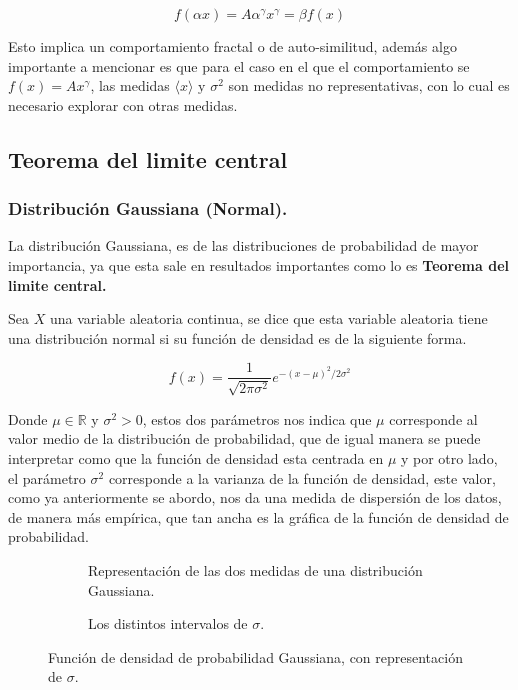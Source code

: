 \begin{equation}
	f(\alpha x) = A \alpha^\gamma x^\gamma = \beta f(x)
\end{equation}


Esto implica un comportamiento fractal o de auto-similitud, además algo importante a mencionar es que para el caso en el que el comportamiento se $f(x) = Ax^\gamma$, las medidas $\langle x \rangle \text{ y } \sigma^2$ son medidas no representativas, con lo cual es necesario explorar con otras medidas.

\subsection{Teorema del limite central}
\subsubsection{Distribución Gaussiana (Normal).}


La distribución Gaussiana, es de las distribuciones de probabilidad de mayor importancia, ya que esta sale en resultados importantes como lo es \textbf{Teorema del limite central.}

Sea $X$ una variable aleatoria continua, se dice que esta variable aleatoria tiene una distribución normal si su función de densidad es de la siguiente forma.

\begin{equation}
	f(x) = \frac{1}{\sqrt{2\pi \sigma^2}} e^{-(x-\mu)^2/2\sigma^2}
\end{equation}

Donde $\mu \in \mathbb{R}$ y $\sigma^2 > 0$, estos dos parámetros nos indica que $\mu$ corresponde al valor medio de la distribución de probabilidad, que de igual manera se puede interpretar como que la función de densidad esta centrada en $\mu$ y por otro lado, el parámetro $\sigma^2$ corresponde a la varianza de la función de densidad, este valor, como ya anteriormente se abordo, nos da una medida de dispersión de los datos, de manera más empírica, que tan ancha es la gráfica de la función de densidad de probabilidad.


\begin{figure}[!ht]
    \centering
    \begin{subfigure}{0.48\textwidth}
    \centering
    \scalebox{1}{}
    \caption{Representación de las dos medidas de una distribución Gaussiana.}
    \label{fig:MedidasGauss}
    \end{subfigure}
    \hfill
    \begin{subfigure}{0.48\textwidth}
    \centering
    \scalebox{1}{}
    \caption{Los distintos intervalos de $\sigma$.}
    \end{subfigure}
    \caption{Función de densidad de probabilidad Gaussiana, con representación de $\sigma$.}
    \label{fig:GaussInterval}
\end{figure}

